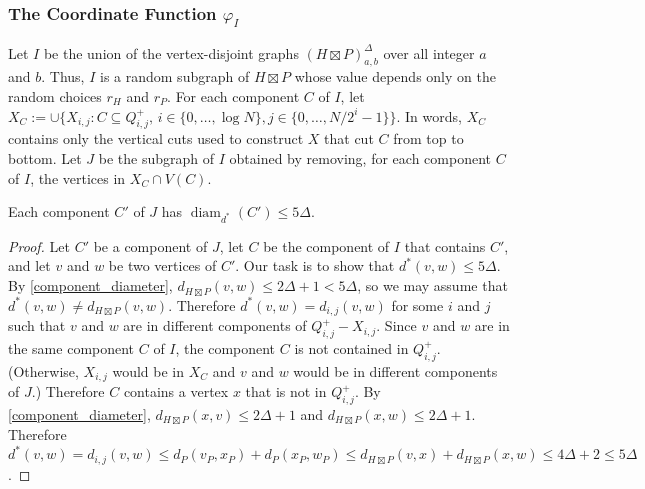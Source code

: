 \documentclass{patmorin}
\renewcommand{\le}{\leqslant}
\DeclareMathOperator{\diam}{diam}
\begin{document}
%
%

\subsubsection{\boldmath The Coordinate Function $\varphi_I$}

Let $I$ be the union of the vertex-disjoint graphs $(H\boxtimes P)^\Delta_{a,b}$ over all integer $a$ and $b$.
Thus, $I$ is a random subgraph of $H\boxtimes P$ whose value depends only on the random choices $r_H$ and $r_P$.  For each component $C$ of $I$, let $X_C:=\cup\{X_{i,j}:C\subseteq Q^+_{i,j},\, i\in\{0,\ldots,\log N\}, j\in\{0,\ldots,N/2^i-1\}\}$.  In words, $X_C$ contains only the vertical cuts used to construct $X$ that cut $C$ from top to bottom. Let $J$ be the subgraph of $I$ obtained by removing, for each component $C$ of $I$, the vertices in $X_C\cap V(C)$.

\begin{lem}\label{dstar_component_diameter}
  Each component $C'$ of $J$ has $\diam_{d^*}(C')\le 5\Delta$.
\end{lem}

\begin{proof}
  Let $C'$ be a component of $J$, let $C$ be the component of $I$ that contains $C'$, and let $v$ and $w$ be two vertices of $C'$. Our task is to show that $d^*(v,w)\le 5\Delta$.  By \cref{component_diameter}, $d_{H\boxtimes P}(v,w)\le 2\Delta+1< 5\Delta$, so we may assume that $d^*(v,w)\neq d_{H\boxtimes P}(v,w)$.  Therefore $d^*(v,w)=d_{i,j}(v,w)$ for some $i$ and $j$ such that $v$ and $w$ are in different components of $Q^+_{i,j}-X_{i,j}$.  Since $v$ and $w$ are in the same component $C$ of $I$, the component $C$ is not contained in $Q^+_{i,j}$. (Otherwise, $X_{i,j}$ would be in $X_C$ and $v$ and $w$ would be in different components of $J$.) Therefore $C$ contains a vertex $x$ that is not in $Q^+_{i,j}$.  By \cref{component_diameter}, $d_{H\boxtimes P}(x,v)\le 2\Delta+1$ and $d_{H\boxtimes P}(x,w)\le 2\Delta+1$.  Therefore $d^*(v,w)=d_{i,j}(v,w)\le d_P(v_P,x_P)+d_P(x_P,w_P)\le d_{H\boxtimes P}(v,x)+d_{H\boxtimes P}(x,w)\le 4\Delta+2\le 5\Delta$.
\end{proof}
\end{document}
